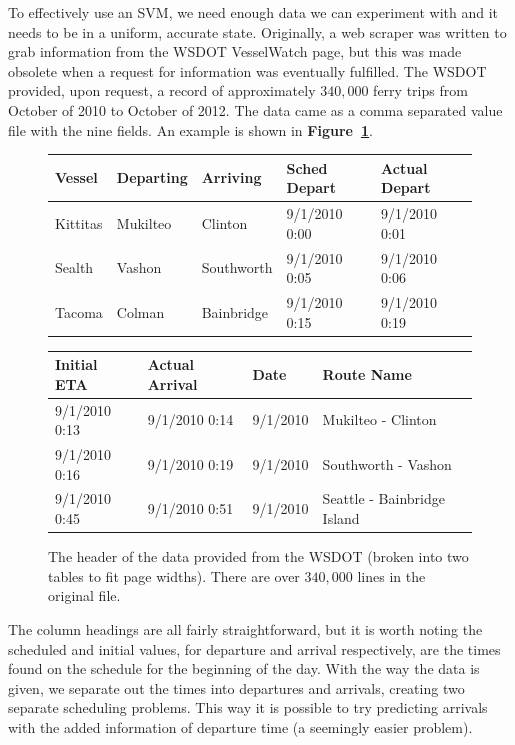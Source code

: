 \documentclass[11pt]{article} %
\begin{document}
To effectively use an SVM, we need enough data we can experiment with and it needs
to be in a uniform, accurate state. Originally, a web scraper was written to grab
information from the WSDOT VesselWatch \cite{wsdotVesselWatch} page, but this was 
made obsolete when a request for information was eventually fulfilled. The WSDOT 
provided, upon request, a record of
approximately $340,000$ ferry trips from October of 2010 to October of 2012. The
data came as a comma separated value file with the nine fields. An example is shown
in \textbf{Figure~\ref{fig:example_wsdot_data}}.

\begin{figure}
    \centering
    \begin{tabular}[h]{lllll}
        \hline
        Vessel & Departing & Arriving & Sched Depart & Actual Depart \\
        \hline
        Kittitas & Mukilteo & Clinton & 9/1/2010 0:00 & 9/1/2010 0:01 \\
        Sealth & Vashon & Southworth & 9/1/2010 0:05 & 9/1/2010 0:06 \\
        Tacoma & Colman & Bainbridge & 9/1/2010 0:15 & 9/1/2010 0:19 \\
    \end{tabular}

    \begin{tabular}[h]{llll}
        \hline
        Initial ETA & Actual Arrival & Date & Route Name\\
        \hline
        9/1/2010 0:13 & 9/1/2010 0:14 & 9/1/2010 & Mukilteo - Clinton \\
        9/1/2010 0:16 & 9/1/2010 0:19 & 9/1/2010 & Southworth - Vashon \\
        9/1/2010 0:45 & 9/1/2010 0:51 & 9/1/2010 & Seattle - Bainbridge Island \\
    \end{tabular}
    \caption{The header of the data provided from the WSDOT (broken into two tables
        to fit page widths). There are over $340,000$ lines in the original file.}
    \label{fig:example_wsdot_data}
\end{figure}

The column headings are all fairly straightforward, but it is worth noting the
scheduled and initial values, for departure and arrival respectively, are the
times found on the schedule for the beginning of the day. With the way the data
is given, we separate out the times into departures and arrivals, creating two
separate scheduling problems. This way it is possible to try predicting arrivals
with the added information of departure time (a seemingly easier problem). 
\end{document}
